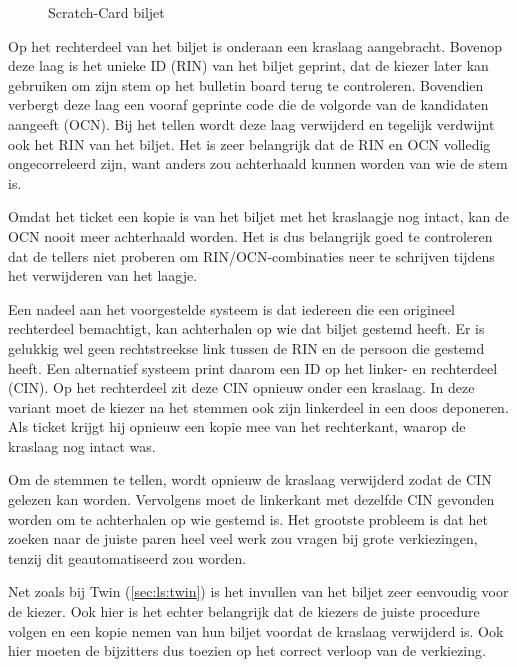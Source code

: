 \begin{figure}
  \caption{Scratch-Card biljet\cite{randell_ryan_voting_technologies_and_trust}}
  \label{fig:ls:scratch-card}
\end{figure}

\npar Op het rechterdeel van het biljet is onderaan een kraslaag aangebracht. Bovenop deze laag is het unieke ID (RIN) van het biljet geprint, dat de kiezer later kan gebruiken om zijn stem op het bulletin board terug te controleren. Bovendien verbergt deze laag een vooraf geprinte code die de volgorde van de kandidaten aangeeft (OCN). Bij het tellen wordt deze laag verwijderd en tegelijk verdwijnt ook het RIN van het biljet. Het is zeer belangrijk dat de RIN en OCN volledig ongecorreleerd zijn, want anders zou achterhaald kunnen worden van wie de stem is.

\npar Omdat het ticket een kopie is van het biljet met het kraslaagje nog intact, kan de OCN nooit meer achterhaald worden. Het is dus belangrijk goed te controleren dat de tellers niet proberen om RIN/OCN-combinaties neer te schrijven tijdens het verwijderen van het laagje.

\npar Een nadeel aan het voorgestelde systeem is dat iedereen die een origineel rechterdeel bemachtigt, kan achterhalen op wie dat biljet gestemd heeft. Er is gelukkig wel geen rechtstreekse link tussen de RIN en de persoon die gestemd heeft. Een alternatief systeem print daarom een ID op het linker- en rechterdeel (CIN). Op het rechterdeel zit deze CIN opnieuw onder een kraslaag. In deze variant moet de kiezer na het stemmen ook zijn linkerdeel in een doos deponeren. Als ticket krijgt hij opnieuw een kopie mee van het rechterkant, waarop de kraslaag nog intact was.

\npar Om de stemmen te tellen, wordt opnieuw de kraslaag verwijderd zodat de CIN gelezen kan worden. Vervolgens moet de linkerkant met dezelfde CIN gevonden worden om te achterhalen op wie gestemd is. Het grootste probleem is dat het zoeken naar de juiste paren heel veel werk zou vragen bij grote verkiezingen, tenzij dit geautomatiseerd zou worden.

\npar Net zoals bij Twin (\ref{sec:ls:twin}) is het invullen van het biljet zeer eenvoudig voor de kiezer. Ook hier is het echter belangrijk dat de kiezers de juiste procedure volgen en een kopie nemen van hun biljet voordat de kraslaag verwijderd is. Ook hier moeten de bijzitters dus toezien op het correct verloop van de verkiezing.

